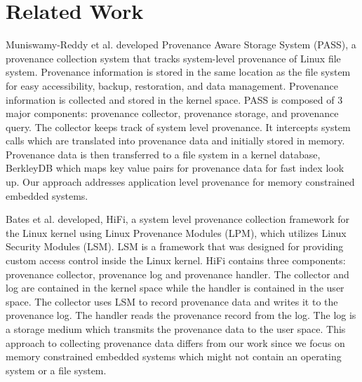 \documentclass[conference]{IEEEtran}
\begin{document}
%

\section{Related Work}

Muniswamy-Reddy
et al. \cite{muniswamy_reddy} developed Provenance Aware Storage System (PASS), a provenance collection system that tracks  system-level provenance of Linux file system. Provenance information
is stored in the same location as the file system for easy accessibility, backup,
restoration, and data management. Provenance information is collected and stored in
the kernel space. PASS is composed of 3 major components: provenance collector, provenance storage, and provenance query. The collector keeps track of system level provenance. It intercepts system calls which are translated into provenance data and initially stored in memory. Provenance data is then transferred to a file system in a kernel database, BerkleyDB which maps key value pairs for provenance data for fast index look up. Our approach addresses application level provenance for memory constrained embedded systems. 

\par Bates et al. \cite{hi_fi}  developed, HiFi, a system level provenance collection framework for the Linux kernel using Linux Provenance Modules (LPM), which utilizes Linux Security Modules (LSM). LSM is a framework that was designed for providing custom access control inside the Linux kernel. HiFi contains three components: provenance collector, provenance log and provenance handler. The collector and log are contained in the kernel space while the handler is contained in the user space. The collector uses LSM to record provenance data and writes it to the provenance log. The handler reads the provenance record from the log. The log is a storage medium which transmits the provenance data to the user space. This approach to collecting provenance data differs from our work since we focus on memory constrained embedded systems which might not contain an operating system or a file system.

\end{document}
